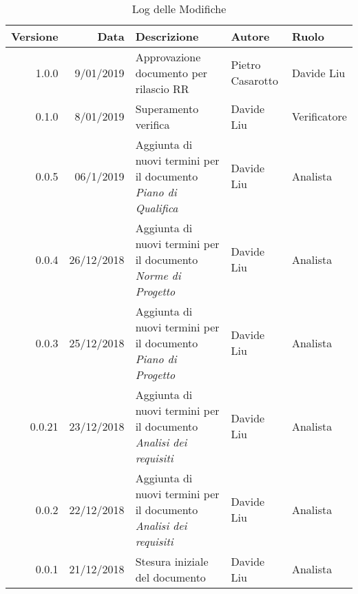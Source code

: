\medskip
~\newline
\begin{table}[!h] %
            \centering
            \renewcommand{\arraystretch}{2}
            \begin{tabular}{|r|r|p{6cm}|l|l|} %
                \rowcolor{orange!50} %
        		\hline
        		\textbf{Versione} & \textbf{Data} & \textbf{Descrizione} & \textbf{Autore} & \textbf{Ruolo} \\
                \hline
                1.0.0 & 9/01/2019 & Approvazione documento per rilascio RR & Pietro Casarotto & Davide Liu \\
                \hline
                0.1.0 & 8/01/2019 & Superamento verifica & Davide Liu & Verificatore \\
                \hline
                0.0.5 & 06/1/2019 & Aggiunta di nuovi termini per il documento \textit{Piano di Qualifica} & Davide Liu & Analista \\
                \hline
                0.0.4 & 26/12/2018 & Aggiunta di nuovi termini per il documento \textit{Norme di Progetto} & Davide Liu & Analista \\
                \hline
                0.0.3 & 25/12/2018 & Aggiunta di nuovi termini per il documento \textit{Piano di Progetto} & Davide Liu & Analista \\
                \hline
                0.0.21 & 23/12/2018 & Aggiunta di nuovi termini per il documento \textit{Analisi dei requisiti} & Davide Liu & Analista \\
                \hline
                0.0.2 & 22/12/2018 & Aggiunta di nuovi termini per il documento \textit{Analisi dei requisiti} & Davide Liu & Analista \\
                \hline
                0.0.1 & 21/12/2018 & Stesura iniziale del documento & Davide Liu & Analista \\
                \hline
                
        \end{tabular}
        \caption{Log delle Modifiche} %
        \label{tab:Log delle modifiche}
\end{table}